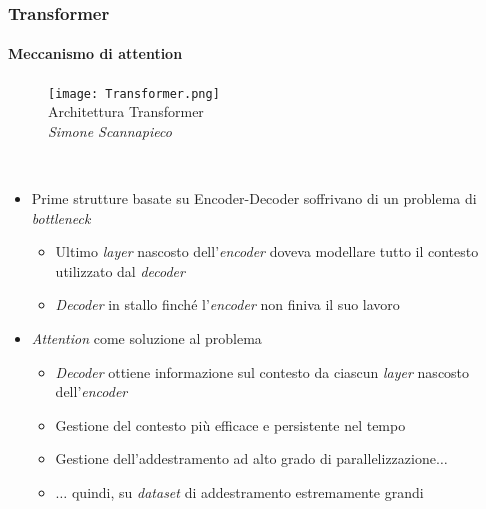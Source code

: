 %
\begin{frame}[t] \frametitle{Transformer}
\framesubtitle{Meccanismo di attention}
{\scriptsize
{}
	\begin{minipage}[t]{\textwidth}
		\vspace*{-.5cm}
		\begin{figure}
			\centering
			\texttt{[image: Transformer.png]}
			{\tiny\\Architettura Transformer\\\textit{\textcopyright Simone Scannapieco}}
		\end{figure}
	\end{minipage}
	\\\vspace*{.3cm}
	\begin{minipage}[t]{\textwidth}
		\begin{itemize}[leftmargin=10pt,align=right]
			\item[\alert{\faArrowCircleRight}] Prime strutture basate su Encoder-Decoder soffrivano di un problema di \emph{bottleneck}
			\begin{itemize}[leftmargin=10pt,align=right]
				\onslide<2->\item[\alert{\faArrowCircleRight}] Ultimo \emph{layer} nascosto dell'\emph{encoder} doveva modellare \alert{tutto} il contesto utilizzato dal \emph{decoder}
				\onslide<3->\item[\alert{\faArrowCircleRight}] \emph{Decoder} in stallo finché l'\emph{encoder} non finiva il suo lavoro
			\end{itemize}
			\item[\alert{\faArrowCircleRight}] \alert{\emph{Attention}} come soluzione al problema
				\begin{itemize}[leftmargin=10pt,align=right]
					\onslide<5->\item[\alert{\faArrowCircleRight}] \emph{Decoder} ottiene informazione sul contesto da ciascun \emph{layer} nascosto dell'\emph{encoder}
					\onslide<6->\item[\alert{\faArrowCircleRight}] Gestione del contesto più efficace e persistente nel tempo
					\onslide<7->\item[\alert{\faArrowCircleRight}] Gestione dell'addestramento ad alto grado di parallelizzazione$\ldots$
					\onslide<8->\item[\alert{\faArrowCircleRight}] $\ldots$ quindi, su \emph{dataset} di addestramento \alert{estremamente grandi}
				\end{itemize}
		\end{itemize}
	\end{minipage}
}
\end{frame}
%
